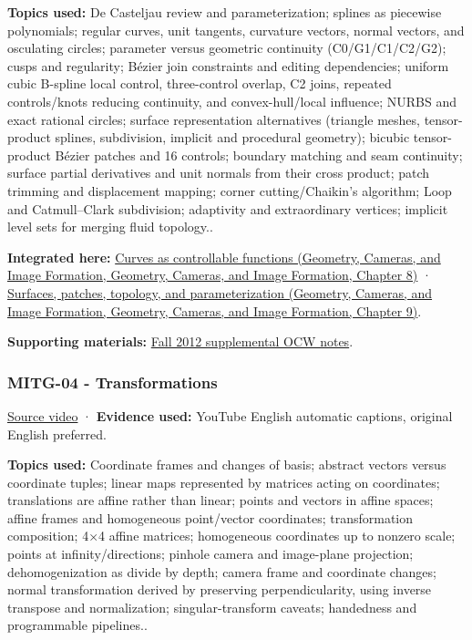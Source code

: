 \textbf{Topics used:} De Casteljau review and parameterization; splines as piecewise polynomials; regular curves, unit tangents, curvature vectors, normal vectors, and osculating circles; parameter versus geometric continuity (C0/G1/C1/C2/G2); cusps and regularity; Bézier join constraints and editing dependencies; uniform cubic B-spline local control, three-control overlap, C2 joins, repeated controls/knots reducing continuity, and convex-hull/local influence; NURBS and exact rational circles; surface representation alternatives (triangle meshes, tensor-product splines, subdivision, implicit and procedural geometry); bicubic tensor-product Bézier patches and 16 controls; boundary matching and seam continuity; surface partial derivatives and unit normals from their cross product; patch trimming and displacement mapping; corner cutting/Chaikin's algorithm; Loop and Catmull--Clark subdivision; adaptivity and extraordinary vertices; implicit level sets for merging fluid topology..

\textbf{Integrated here:} \href{../03-Geometry-Cameras-and-Image-Formation/main.pdf\#nameddest=03-visual-computing-i-ch001-curves-as-controllable-functions}{Curves as controllable functions (Geometry, Cameras, and Image Formation, Geometry, Cameras, and Image Formation, Chapter 8)} · \href{../03-Geometry-Cameras-and-Image-Formation/main.pdf\#nameddest=03-visual-computing-i-ch002-surfaces-patches-topology-and-parameterization}{Surfaces, patches, topology, and parameterization (Geometry, Cameras, and Image Formation, Geometry, Cameras, and Image Formation, Chapter 9)}.

\textbf{Supporting materials:} \href{https://ocw.mit.edu/courses/6-837-computer-graphics-fall-2012/pages/lecture-notes/}{Fall 2012 supplemental OCW notes}.

\subsubsection{MITG-04 - Transformations}\label{04-visual-computing-ii-ch036-mitg-04---transformations}

\href{https://www.youtube.com/watch?v=WqmL_e7OGeU}{Source video} · \textbf{Evidence used:} YouTube English automatic captions, original English preferred.

\textbf{Topics used:} Coordinate frames and changes of basis; abstract vectors versus coordinate tuples; linear maps represented by matrices acting on coordinates; translations are affine rather than linear; points and vectors in affine spaces; affine frames and homogeneous point/vector coordinates; transformation composition; 4×4 affine matrices; homogeneous coordinates up to nonzero scale; points at infinity/directions; pinhole camera and image-plane projection; dehomogenization as divide by depth; camera frame and coordinate changes; normal transformation derived by preserving perpendicularity, using inverse transpose and normalization; singular-transform caveats; handedness and programmable pipelines..

